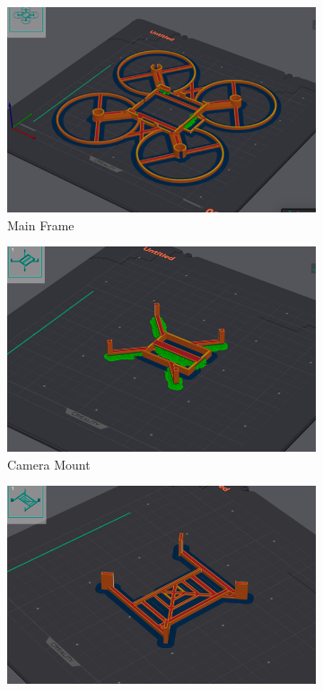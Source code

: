 \begin{figure}[H]
  \centering
  \begin{subfigure}[b]{0.48\linewidth}
    \centering
    \includegraphics[width=\linewidth]{img/manual/3dp1.png}
    \caption{Main Frame}
  \end{subfigure}
  \hfill
  \begin{subfigure}[b]{0.48\linewidth}
    \centering
    \includegraphics[width=\linewidth]{img/manual/3dp2.png}
    \caption{Camera Mount}
  \end{subfigure}
  \begin{subfigure}[b]{0.48\linewidth}
    \centering
    \includegraphics[width=\linewidth]{img/manual/3dp3.png}

\end{subfigure}
\end{figure}
